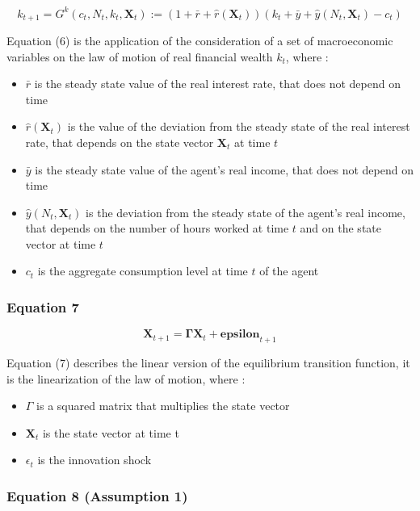 \documentclass{article}
\begin{document}
\begin{equation}
    k_{t+1}=G^{k}(c_{t},N_{t}, k_{t}, \bm{X}_t):= (1+\bar{r}+\hat{r}(\bm{X}_{t}))(k_{t}+\bar{y}+\hat{y}(N_{t},\bm{X}_t)-c_{t})
\end{equation}

Equation (6) is the application of the consideration of a set of macroeconomic variables on the law of motion of real financial wealth $k_{t}$, where : 
\begin{itemize}
    \item $\bar{r}$ is the steady state value of the real interest rate, that does not depend on time
    \item $\hat{r}(\bm{X}_t)$ is the value of the deviation from the steady state of the real interest rate, that depends on the state vector $\bm{X}_{t}$ at time $t$
    \item $\bar{y}$ is the steady state value of the agent's real income, that does not depend on time
    \item $\hat{y}(N_{t},\bm{X}_{t})$ is the deviation from the steady state of the agent's real income, that depends on the number of hours worked at time $t$ and on the state vector at time $t$
    \item $c_{t}$ is the aggregate consumption level at time $t$ of the agent
\end{itemize}

\subsubsection*{Equation 7}

\begin{equation}
    \bm{X}_{t+1}=\bm{\Gamma}\bm{X}_{t}+\bm{epsilon}_{t+1}
\end{equation}

Equation (7) describes the linear version of the equilibrium transition function, it is the linearization of the law of motion, where :
\begin{itemize}
    \item $\Gamma$ is a squared matrix that multiplies the state vector
    \item $\bm{X}_t$ is the state vector at time t
    \item $\epsilon_{t}$ is the innovation shock
\end{itemize}

\subsubsection*{Equation 8 (Assumption 1)}
\end{document}
